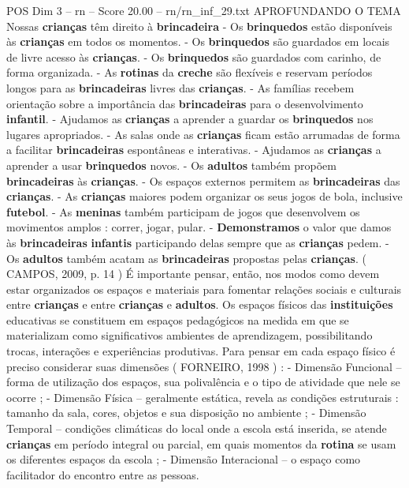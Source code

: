 \begin{textsample}{POS Dim 3 – rn – Score 20.00 – rn/rn\_inf\_29.txt}
APROFUNDANDO O TEMA Nossas \textbf{crianças} têm direito à \textbf{brincadeira} - Os \textbf{brinquedos} estão disponíveis às \textbf{crianças} em todos os momentos. - Os \textbf{brinquedos} são guardados em locais de livre acesso às \textbf{crianças}. - Os \textbf{brinquedos} são guardados com carinho, de forma organizada. - As \textbf{rotinas} da \textbf{creche} são flexíveis e reservam períodos longos para as \textbf{brincadeiras} livres das \textbf{crianças}. - As famílias recebem orientação sobre a importância das \textbf{brincadeiras} para o desenvolvimento \textbf{infantil}. - Ajudamos as \textbf{crianças} a aprender a guardar os \textbf{brinquedos} nos lugares apropriados. - As salas onde as \textbf{crianças} ficam estão arrumadas de forma a facilitar \textbf{brincadeiras} espontâneas e interativas. - Ajudamos as \textbf{crianças} a aprender a usar \textbf{brinquedos} novos. - Os \textbf{adultos} também propõem \textbf{brincadeiras} às \textbf{crianças}. - Os espaços externos permitem as \textbf{brincadeiras} das \textbf{crianças}. - As \textbf{crianças} maiores podem organizar os seus jogos de bola, inclusive \textbf{futebol}. - As \textbf{meninas} também participam de jogos que desenvolvem os movimentos amplos : correr, jogar, pular. - \textbf{Demonstramos} o valor que damos às \textbf{brincadeiras} \textbf{infantis} participando delas sempre que as \textbf{crianças} pedem. - Os \textbf{adultos} também acatam as \textbf{brincadeiras} propostas pelas \textbf{crianças}. ( CAMPOS, 2009, p. 14 ) É importante pensar, então, nos modos como devem estar organizados os espaços e materiais para fomentar relações sociais e culturais entre \textbf{crianças} e entre \textbf{crianças} e \textbf{adultos}.
Os espaços físicos das \textbf{instituições} educativas se constituem em espaços pedagógicos na medida em que se materializam como significativos ambientes de aprendizagem, possibilitando trocas, interações e experiências produtivas.
Para pensar em cada espaço físico é preciso considerar suas dimensões ( FORNEIRO, 1998 ) : - Dimensão Funcional – forma de utilização dos espaços, sua polivalência e o tipo de atividade que nele se ocorre ; - Dimensão Física – geralmente estática, revela as condições estruturais : tamanho da sala, cores, objetos e sua disposição no ambiente ; - Dimensão Temporal – condições climáticas do local onde a escola está inserida, se atende \textbf{crianças} em período integral ou parcial, em quais momentos da \textbf{rotina} se usam os diferentes espaços da escola ; - Dimensão Interacional – o espaço como facilitador do encontro entre as pessoas.

\end{textsample}

